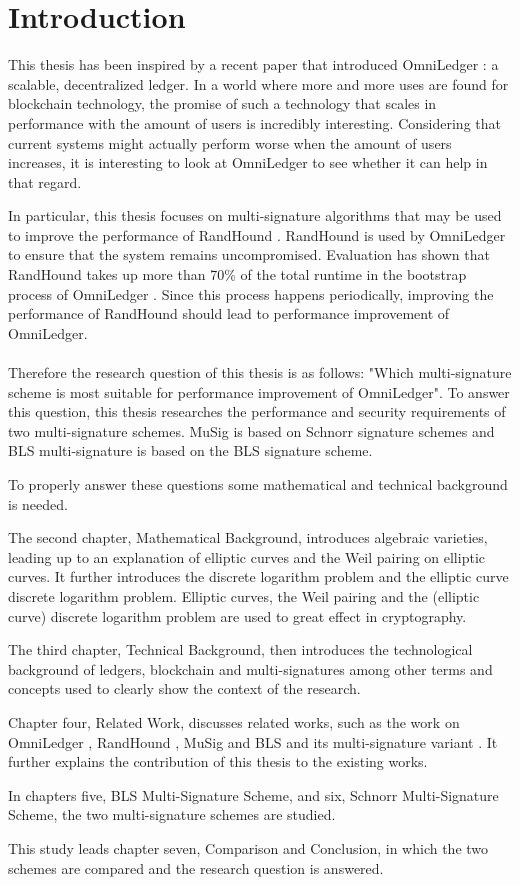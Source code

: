 \chapter{Introduction}
This thesis has been inspired by a recent paper that introduced OmniLedger \cite{OmniLedger}: a scalable, decentralized ledger. In a world where more and more uses are found for blockchain technology, the promise of such a technology that scales in performance with the amount of users is incredibly interesting. Considering that current systems might actually perform worse when the amount of users increases, it is interesting to look at OmniLedger to see whether it can help in that regard.

In particular, this thesis focuses on multi-signature algorithms that may be used to improve the performance of RandHound \cite{RandHound}. RandHound is used by OmniLedger to ensure that the system remains uncompromised. Evaluation has shown that RandHound takes up more than 70\% of the total runtime in the bootstrap process of OmniLedger \cite{OmniLedger}. Since this process happens periodically, improving the performance of RandHound should lead to performance improvement of OmniLedger.
\\
\\
Therefore the research question of this thesis is as follows: "Which multi-signature scheme is most suitable for performance improvement of OmniLedger". To answer this question, this thesis researches the performance and security requirements of two multi-signature schemes. MuSig \cite{SchnorrMulti} is based on Schnorr signature schemes and BLS multi-signature \cite{BLSMulti} is based on the BLS \cite{BLS} signature scheme.

To properly answer these questions some mathematical and technical background is needed.

The second chapter, Mathematical Background, introduces algebraic varieties, leading up to an explanation of elliptic curves and the Weil pairing on elliptic curves. It further introduces the discrete logarithm problem and the elliptic curve discrete logarithm problem. Elliptic curves, the Weil pairing and the (elliptic curve) discrete logarithm problem are used to great effect in cryptography.

The third chapter, Technical Background, then introduces the technological background of ledgers, blockchain and multi-signatures among other terms and concepts used to clearly show the context of the research.

Chapter four, Related Work, discusses related works, such as the work on OmniLedger \cite{OmniLedger}, RandHound \cite{RandHound}, MuSig \cite{SchnorrMulti} and BLS \cite{BLSMulti} and its multi-signature variant \cite{BLSMulti}. It further explains the contribution of this thesis to the existing works.

In chapters five, BLS Multi-Signature Scheme, and six, Schnorr Multi-Signature Scheme, the two multi-signature schemes are studied.

This study leads chapter seven, Comparison and Conclusion, in which the two schemes are compared and the research question is answered.